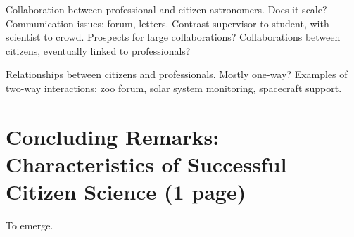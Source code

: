 \documentclass{ar2e}
\begin{document}
\begin{description}
Collaboration between professional and citizen astronomers. Does it scale?
Communication issues: forum, letters. Contrast supervisor to student, with
scientist to crowd. Prospects for large collaborations? Collaborations between
citizens, eventually linked to professionals?

Relationships between citizens and professionals. Mostly one-way? Examples of
two-way interactions: zoo forum, solar system monitoring, spacecraft support.

% 


\end{description}



\section{Concluding Remarks: Characteristics of Successful Citizen Science (1 page)}
\label{sec:conclusions}





To emerge.
\end{document}
